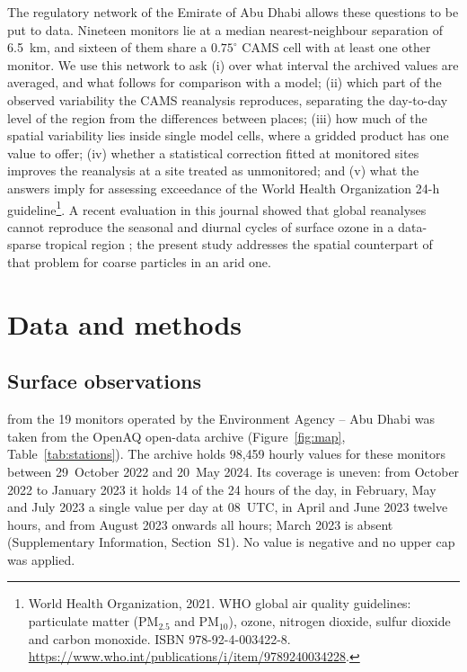 The regulatory network of the Emirate of Abu Dhabi allows these questions to be put to data.
Nineteen \pmten{} monitors lie at a median nearest-neighbour separation of 6.5~km, and sixteen of
them share a $0.75^{\circ}$ CAMS cell with at least one other monitor. We use this network to ask
(i) over what interval the archived values are averaged, and what follows for comparison with a
model; (ii) which part of the observed variability the CAMS reanalysis reproduces, separating the
day-to-day level of the region from the differences between places; (iii) how much of the spatial
variability lies inside single model cells, where a gridded product has one value to offer;
(iv) whether a statistical correction fitted at monitored sites improves the reanalysis at a site
treated as unmonitored; and (v) what the answers imply for assessing exceedance of the World
Health Organization 24-h guideline\footnote{World Health Organization, 2021. WHO global air quality guidelines: particulate matter (PM$_{2.5}$ and PM$_{10}$), ozone, nitrogen dioxide, sulfur dioxide and carbon monoxide. ISBN 978-92-4-003422-8. \url{https://www.who.int/publications/i/item/9789240034228}.}. A recent evaluation in this journal showed
that global reanalyses cannot reproduce the seasonal and diurnal cycles of surface ozone in a
data-sparse tropical region \citep{vieira2023}; the present study addresses the spatial
counterpart of that problem for coarse particles in an arid one.

\section{Data and methods}

\subsection{Surface observations}
\label{sec:obs}

\pmten{} from the 19 monitors operated by the Environment Agency -- Abu Dhabi was taken from the
OpenAQ open-data archive \citep{rosales2025} (Figure~\ref{fig:map}, Table~\ref{tab:stations}).
The archive holds 98,459 hourly \pmten{} values for these monitors between 29~October 2022 and
20~May 2024. Its coverage is uneven: from October 2022 to January 2023 it holds 14 of the 24
hours of the day, in February, May and July 2023 a single value per day at 08~UTC, in April and
June 2023 twelve hours, and from August 2023 onwards all hours; March 2023 is absent
(Supplementary Information, Section~S1). No value is negative and no upper cap was applied.

